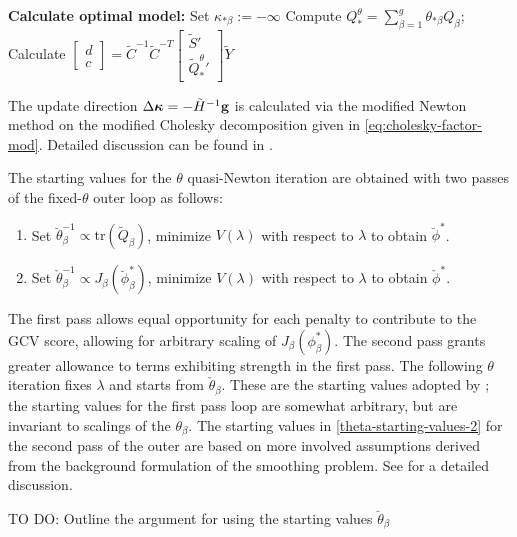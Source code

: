 \documentclass[12pt]{article}
\newcommand{\bfkappa}{\mbox{\boldmath $\kappa$}}
\newcommand{\tildeS}{\tilde{S}}
\newcommand{\tildeY}{\tilde{Y}}
\newcommand{\tildeQ}{\tilde{Q}}
\theoremstyle{definition}
\begin{document}
\begin{algorithm}[H]
\begin{algorithmic}
			\ENDIF
	\ENDWHILE
\STATE \textbf{Calculate optimal model:} 
		\STATE Set $\kappa_{*\beta} := -\infty$
	\ENDIF
	\STATE Compute $Q_*^\theta = \sum_{\beta = 1}^g \theta_{*\beta} Q_\beta$;
	\STATE Calculate $\begin{bmatrix} d \\ c \end{bmatrix} = \tilde{C}^{-1} \tilde{C}^{-T} \begin{bmatrix} \tildeS' \\ {\tildeQ_*^\theta}' \end{bmatrix} \tildeY$
					
\end{algorithmic}
\end{algorithm}

The update direction $\Delta \bfkappa = -\tilde{H}^{-1} \mathbf{g}$ is calculated via the modified Newton method on the modified Cholesky decomposition given in \ref{eq:cholesky-factor-mod}. Detailed discussion can be found in \citet{gill1981practical}.
\bigskip

The starting values for the $\theta$ quasi-Newton iteration are obtained with two passes of the fixed-$\theta$ outer loop as follows:

\begin{enumerate}
\item Set $\breve{\theta}_\beta^{-1} \propto \mbox{tr}\left( \tildeQ_\beta \right)$, minimize $V\left(\lambda\right)$ with respect to $\lambda$ to obtain $\breve{\phi}^*$. \label{theta-starting-values-1}
\item Set $\check{\theta}_\beta^{-1} \propto  J_\beta\left(\breve{\phi}^*_\beta \right)$, minimize $V\left(\lambda\right)$ with respect to $\lambda$ to obtain $\check{\phi}^*$. \label{theta-starting-values-2}
\end{enumerate}
\noindent
The first pass allows equal opportunity for each penalty to contribute to the GCV score, allowing for arbitrary scaling of $J_\beta \left(\phi^*_\beta\right)$. The second pass grants greater allowance to terms exhibiting strength in the first pass. The following $\theta$ iteration fixes $\lambda$ and starts from $\check{\theta}_\beta$. These are the starting values adopted by \citet{gu1991minimizing}; the starting values for the first pass loop are somewhat arbitrary, but are invariant to scalings of the $\theta_\beta$. The starting values in \ref{theta-starting-values-2} for the second pass of the outer are based on more involved assumptions derived from the background formulation of the smoothing problem. See \citet{gu1991minimizing} for a detailed discussion.

\bigskip
TO DO: Outline the argument for using the starting values $\breve{\theta}_\beta$
\bigskip





\end{document}
